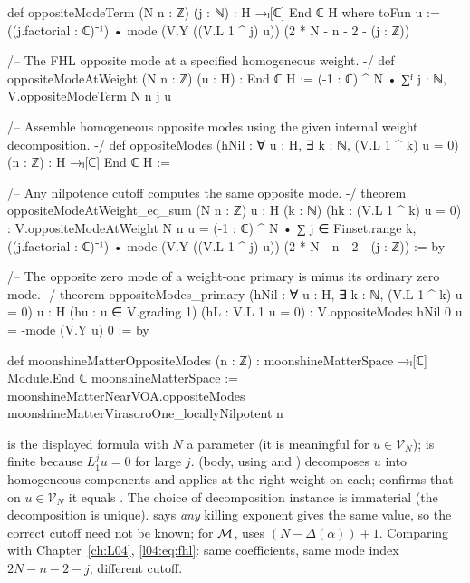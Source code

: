 \begin{leancode}
def oppositeModeTerm (N n : ℤ) (j : ℕ) : H →ₗ[ℂ] End ℂ H where
  toFun u := ((j.factorial : ℂ)⁻¹) • mode (V.Y ((V.L 1 ^ j) u))
    (2 * N - n - 2 - (j : ℤ))

/-- The FHL opposite mode at a specified homogeneous weight. -/
def oppositeModeAtWeight (N n : ℤ) (u : H) : End ℂ H :=
  (-1 : ℂ) ^ N • ∑ᶠ j : ℕ, V.oppositeModeTerm N n j u

/-- Assemble homogeneous opposite modes using the given internal weight decomposition. -/
def oppositeModes (hNil : ∀ u : H, ∃ k : ℕ, (V.L 1 ^ k) u = 0)
    (n : ℤ) : H →ₗ[ℂ] End ℂ H :=

/-- Any nilpotence cutoff computes the same opposite mode. -/
theorem oppositeModeAtWeight_eq_sum (N n : ℤ) {u : H} (k : ℕ)
    (hk : (V.L 1 ^ k) u = 0) :
    V.oppositeModeAtWeight N n u = (-1 : ℂ) ^ N •
      ∑ j ∈ Finset.range k, ((j.factorial : ℂ)⁻¹) •
        mode (V.Y ((V.L 1 ^ j) u)) (2 * N - n - 2 - (j : ℤ)) := by

/-- The opposite zero mode of a weight-one primary is minus its ordinary zero mode. -/
theorem oppositeModes_primary (hNil : ∀ u : H, ∃ k : ℕ, (V.L 1 ^ k) u = 0)
    {u : H} (hu : u ∈ V.grading 1) (hL : V.L 1 u = 0) :
    V.oppositeModes hNil 0 u = -mode (V.Y u) 0 := by

def moonshineMatterOppositeModes (n : ℤ) :
    moonshineMatterSpace →ₗ[ℂ] Module.End ℂ moonshineMatterSpace :=
  moonshineMatterNearVOA.oppositeModes moonshineMatterVirasoroOne_locallyNilpotent n
\end{leancode}

\begin{dictionary}
 is the displayed formula with $N$ a parameter (it is meaningful for $u\in\mathcal V_N$);
 is finite because $L_1^ju=0$ for large $j$.   (body, using
 and ) decomposes $u$ into homogeneous components and
applies  at the right weight on each;  confirms that on
$u\in\mathcal V_N$ it equals .  The choice of decomposition instance is immaterial (the
decomposition is unique).   says \emph{any} killing exponent gives the same value, so the
correct cutoff need not be known; for $\mathcal{M}$,  uses
$(N-\Delta(\alpha))+1$.  Comparing with Chapter~\ref{ch:L04}, \eqref{l04:eq:fhl}: same coefficients, same mode index
$2N-n-2-j$, different cutoff.
\end{dictionary}

